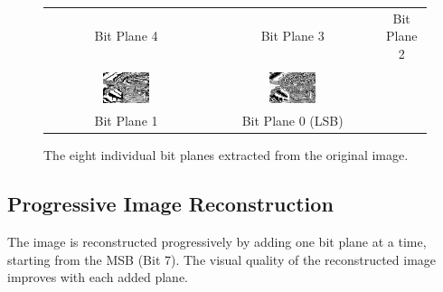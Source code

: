 \documentclass{article}
\begin{document}
\begin{figure}[H]
\begin{tabular}{ccc}
        Bit Plane 4 & Bit Plane 3 & Bit Plane 2 \\
        \\
        \includegraphics[width=0.3\textwidth]{images/bit_plane_1.png} &
        \includegraphics[width=0.3\textwidth]{images/bit_plane_0.png} &
        \\
        Bit Plane 1 & Bit Plane 0 (LSB) & \\
    \end{tabular}
    \caption{The eight individual bit planes extracted from the original image.}
    \label{fig:bitplanes}
\end{figure}

\clearpage
\subsection{Progressive Image Reconstruction}
The image is reconstructed progressively by adding one bit plane at a time, starting from the MSB (Bit 7). The visual quality of the reconstructed image improves with each added plane.
\end{document}
